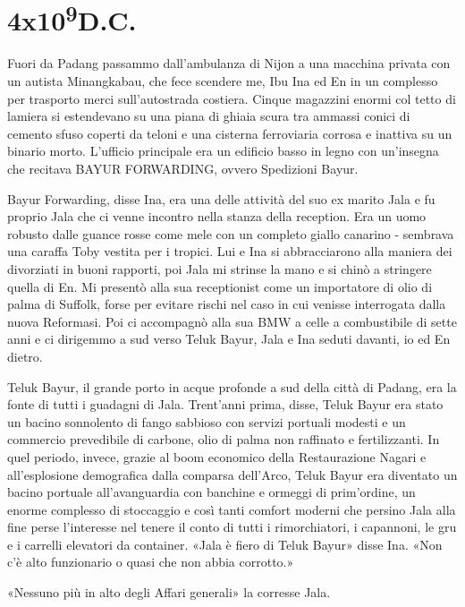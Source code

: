 \chapter{4x10\textsuperscript{9}D.C.}\label{4x10^9-8}

\hfill\break

Fuori da Padang passammo dall'ambulanza di Nijon a una macchina privata
con un autista Minangkabau, che fece scendere me, Ibu Ina ed En in un
complesso per trasporto merci sull'autostrada costiera. Cinque magazzini
enormi col tetto di lamiera si estendevano su una piana di ghiaia scura
tra ammassi conici di cemento sfuso coperti da teloni e una cisterna
ferroviaria corrosa e inattiva su un binario morto. L'ufficio principale
era un edificio basso in legno con un'insegna che recitava B{AYUR}
F{ORWARDING}, ovvero Spedizioni Bayur.

Bayur Forwarding, disse Ina, era una delle attività del suo ex marito
Jala e fu proprio Jala che ci venne incontro nella stanza della
reception. Era un uomo robusto dalle guance rosse come mele con un
completo giallo canarino - sembrava una caraffa Toby vestita per i
tropici. Lui e Ina si abbracciarono alla maniera dei divorziati in buoni
rapporti, poi Jala mi strinse la mano e si chinò a stringere quella di
En. Mi presentò alla sua receptionist come un importatore di olio di
palma di Suffolk, forse per evitare rischi nel caso in cui venisse
interrogata dalla nuova Reformasi. Poi ci accompagnò alla sua BMW a
celle a combustibile di sette anni e ci dirigemmo a sud verso Teluk
Bayur, Jala e Ina seduti davanti, io ed En dietro.

Teluk Bayur, il grande porto in acque profonde a sud della città di
Padang, era la fonte di tutti i guadagni di Jala. Trent'anni prima,
disse, Teluk Bayur era stato un bacino sonnolento di fango sabbioso con
servizi portuali modesti e un commercio prevedibile di carbone, olio di
palma non raffinato e fertilizzanti. In quel periodo, invece, grazie al
boom economico della Restaurazione Nagari e all'esplosione demografica
dalla comparsa dell'Arco, Teluk Bayur era diventato un bacino portuale
all'avanguardia con banchine e ormeggi di prim'ordine, un enorme
complesso di stoccaggio e così tanti comfort moderni che persino Jala
alla fine perse l'interesse nel tenere il conto di tutti i
rimorchiatori, i capannoni, le gru e i carrelli elevatori da container.
«Jala è fiero di Teluk Bayur» disse Ina. «Non c'è alto funzionario o
quasi che non abbia corrotto.»

«Nessuno più in alto degli Affari generali» la corresse Jala.

